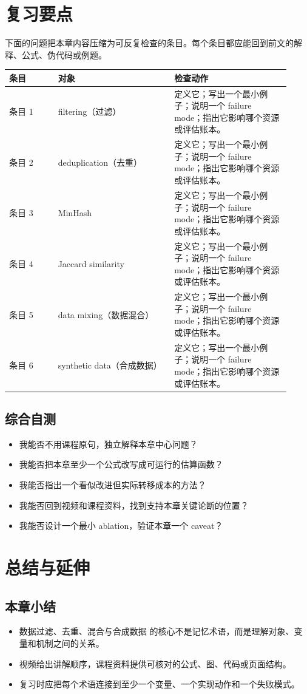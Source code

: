 \documentclass[a4paper]{article}
\begin{document}
\section{复习要点}
下面的问题把本章内容压缩为可反复检查的条目。每个条目都应能回到前文的解释、公式、伪代码或例题。
\begin{longtable}{p{0.16\linewidth}p{0.38\linewidth}p{0.38\linewidth}}
\toprule
\textbf{条目} & \textbf{对象} & \textbf{检查动作}\\
\midrule
条目 1 & filtering（过滤） & 定义它；写出一个最小例子；说明一个 failure mode；指出它影响哪个资源或评估账本。\\
条目 2 & deduplication（去重） & 定义它；写出一个最小例子；说明一个 failure mode；指出它影响哪个资源或评估账本。\\
条目 3 & MinHash & 定义它；写出一个最小例子；说明一个 failure mode；指出它影响哪个资源或评估账本。\\
条目 4 & Jaccard similarity & 定义它；写出一个最小例子；说明一个 failure mode；指出它影响哪个资源或评估账本。\\
条目 5 & data mixing（数据混合） & 定义它；写出一个最小例子；说明一个 failure mode；指出它影响哪个资源或评估账本。\\
条目 6 & synthetic data（合成数据） & 定义它；写出一个最小例子；说明一个 failure mode；指出它影响哪个资源或评估账本。\\
\bottomrule
\end{longtable}
\subsection{综合自测}
\begin{itemize}
\item 我能否不用课程原句，独立解释本章中心问题？
\item 我能否把本章至少一个公式改写成可运行的估算函数？
\item 我能否指出一个看似改进但实际转移成本的方法？
\item 我能否回到视频和课程资料，找到支持本章关键论断的位置？
\item 我能否设计一个最小 ablation，验证本章一个 caveat？
\end{itemize}
\section{总结与延伸}
\subsection{本章小结}
\begin{itemize}
\item 数据过滤、去重、混合与合成数据 的核心不是记忆术语，而是理解对象、变量和机制之间的关系。
\item 视频给出讲解顺序，课程资料提供可核对的公式、图、代码或页面结构。
\item 复习时应把每个术语连接到至少一个变量、一个实现动作和一个失败模式。
\end{itemize}
\end{document}
